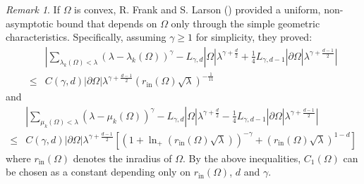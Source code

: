 \documentclass[11pt,letterpaper]{amsart}
\numberwithin{equation}{section}
\theoremstyle{plain}
\theoremstyle{plain}
\numberwithin{equation}{section}
\theoremstyle{remark}
\newtheorem{remark}[theorem]{Remark}
\begin{document}
\begin{remark}\label{rkconvex}
	If $\Omega$ is convex, R. Frank and S. Larson (\cite[Theorem 1.2]{FL24Lip}) provided a uniform, non-asymptotic bound that depends on $\Omega$ only through the simple geometric characteristics. Specifically, assuming $\gamma\ge 1$ for simplicity, they proved:
	\[
	\begin{aligned}
	 &|\sum_{\lambda_k(\Omega)< \lambda} (\lambda-\lambda_k(\Omega))^\gamma- L_{\gamma,d}|\Omega| \lambda^{\gamma+\frac{d}{2}}+\frac{1}{4} L_{\gamma,d-1} |\partial \Omega| \lambda^{\gamma+\frac{d-1}{2}}|\\
	 \le&C(\gamma,d) |\partial \Omega|\lambda^{\gamma+\frac{d-1}{2}}(r_{\mathrm{in}}(\Omega)\sqrt\lambda)^{-\frac 1{11}}
	\end{aligned}
	\]
	and 
	\[
	\begin{aligned}
     &|\sum_{\mu_k(\Omega)< \lambda} (\lambda-\mu_k(\Omega))^\gamma- L_{\gamma,d}|\Omega| \lambda^{\gamma+\frac{d}{2}}- \frac{1}{4} L_{\gamma,d-1} |\partial \Omega| \lambda^{\gamma+\frac{d-1}{2}}|\\
     \le& C(\gamma,d)|\partial \Omega|\lambda^{\gamma+\frac{d-1}{2}}[(1+\ln_+(r_{\mathrm{in}}(\Omega)\sqrt\lambda))^{-\gamma}+(r_{\mathrm{in}}(\Omega)\sqrt\lambda)^{1-d}]
	\end{aligned}
	\]
	where $r_{\mathrm{in}}(\Omega)$ denotes the inradius of $\Omega$.
	By the above inequalities, $C_1(\Omega)$ can be chosen as a constant depending only on  $r_{\mathrm{in}}(\Omega)$, $d$ and $\gamma$.
\end{remark}
	
\end{document}
